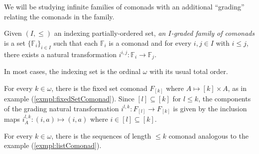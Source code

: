 We will be studying infinite families of comonads with an additional ``grading'' relating the comonads in the family.
\begin{defn}
Given $(I,\leq)$ an indexing partially-ordered set, \textit{an $I$-graded family of comonads} is a set $\{\mathbb{F}_{i}\}_{i \in I}$ such that each $\mathbb{F}_{i}$ is a comonad and for every $i, j \in I$ with $i \leq j$, there exists a natural transformation $i^{i,j}:\mathbb{F}_{i} \longrightarrow \mathbb{F}_{j}$.  
\end{defn}
In most cases, the indexing set is the ordinal $\omega$ with its usual total order.  
\begin{exmpl}
For every $k \in \omega$, there is the fixed set comonad $F_{[k]}$ where $A \mapsto [k] \times A$, as in example (\ref{exmpl:fixedSetComonad}). Since $[l] \subseteq [k]$ for $l \leq k$, the components of the grading natural transformation $i^{l,k}:F_{[l]} \longrightarrow F_{[k]}$ is given by the inclusion maps $i^{l,k}_{A}:(i,a) \mapsto (i,a)$ where $i \in [l] \subseteq [k]$. 
\end{exmpl}
\begin{exmpl}
For every $k \in \omega$, there is the sequences of length $\leq k$ comonad analogous to the example (\ref{exmpl:listComonad}). 
\end{exmpl}
